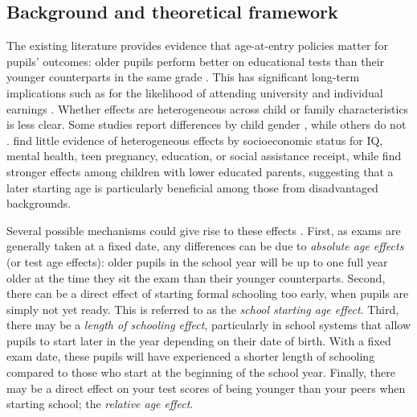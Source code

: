 \documentclass[12pt,a4paper]{article}
\begin{document}
\begin{bibunit}
\subsection{Background and theoretical framework} \label{sec:econModel}
The existing literature provides evidence that age-at-entry policies matter for pupils' outcomes:  older pupils perform better on educational tests than their younger counterparts in the same grade \citep[see, e.g.,][]{Bedard2006,Fredriksson2005,Black2011,Crawford2010,Ritchie2018}. This has significant long-term implications \citep{Page2019} such as for the likelihood of attending university \citep{Bedard2006} and individual earnings \citep{Fredriksson2005}. 
Whether effects are heterogeneous across child or family characteristics is less clear. Some studies report differences by child gender \citep[e.g.,][]{cornelissen2019early}, while others do not \citep[e.g.,][]{Fredriksson2005}. \cite{Black2011} find little evidence of heterogeneous effects by socioeconomic status for IQ, mental health, teen pregnancy, education, or social assistance receipt, while \cite{Fredriksson2005} find stronger effects among children with lower educated parents, suggesting that a later starting age is particularly beneficial among those from disadvantaged backgrounds.

Several possible mechanisms could give rise to these effects \citep[see][]{Crawford2010}. First, as exams are generally taken at a fixed date, any differences can be due to \textit{absolute age effects} (or test age effects):  older pupils in the school year will be up to one full year older at the time they sit the exam than their younger counterparts. Second, there can be a direct effect of starting formal schooling too early, when pupils are simply not yet ready.  This is referred to as the \textit{school starting age effect}. Third, there may be a \textit{length of schooling effect}, particularly in school systems that allow pupils to start later in the year depending on their date of birth. With a fixed exam date, these pupils will have experienced a shorter length of schooling compared to those who start at the beginning of the school year. Finally, there may be a direct effect on your test scores of being younger than your peers when starting school; the \textit{relative age effect}. 


\end{bibunit}
\end{document}
